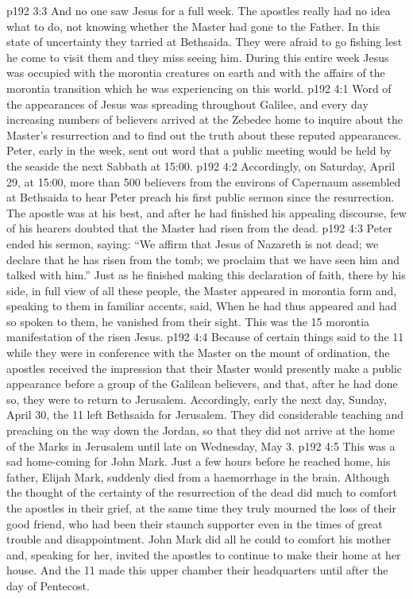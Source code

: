 \vs p192 3:3 \pc And no one saw Jesus for a full week. The apostles really had no idea what to do, not knowing whether the Master had gone to the Father. In this state of uncertainty they tarried at Bethsaida. They were afraid to go fishing lest he come to visit them and they miss seeing him. During this entire week Jesus was occupied with the morontia creatures on earth and with the affairs of the morontia transition which he was experiencing on this world.
\vs p192 4:1 Word of the appearances of Jesus was spreading throughout Galilee, and every day increasing numbers of believers arrived at the Zebedee home to inquire about the Master’s resurrection and to find out the truth about these reputed appearances. Peter, early in the week, sent out word that a public meeting would be held by the seaside the next Sabbath at 15:00.
\vs p192 4:2 Accordingly, on Saturday, April 29, at 15:00, more than 500 believers from the environs of Capernaum assembled at Bethsaida to hear Peter preach his first public sermon since the resurrection. The apostle was at his best, and after he had finished his appealing discourse, few of his hearers doubted that the Master had risen from the dead.
\vs p192 4:3 Peter ended his sermon, saying: “We affirm that Jesus of Nazareth is not dead; we declare that he has risen from the tomb; we proclaim that we have seen him and talked with him.” Just as he finished making this declaration of faith, there by his side, in full view of all these people, the Master appeared in morontia form and, speaking to them in familiar accents, said,  When he had thus appeared and had so spoken to them, he vanished from their sight. This was the 15 morontia manifestation of the risen Jesus.
\vs p192 4:4 \pc Because of certain things said to the 11 while they were in conference with the Master on the mount of ordination, the apostles received the impression that their Master would presently make a public appearance before a group of the Galilean believers, and that, after he had done so, they were to return to Jerusalem. Accordingly, early the next day, Sunday, April 30, the 11 left Bethsaida for Jerusalem. They did considerable teaching and preaching on the way down the Jordan, so that they did not arrive at the home of the Marks in Jerusalem until late on Wednesday, May 3.
\vs p192 4:5 \pc This was a sad home\hyp{}coming for John Mark. Just a few hours before he reached home, his father, Elijah Mark, suddenly died from a haemorrhage in the brain. Although the thought of the certainty of the resurrection of the dead did much to comfort the apostles in their grief, at the same time they truly mourned the loss of their good friend, who had been their staunch supporter even in the times of great trouble and disappointment. John Mark did all he could to comfort his mother and, speaking for her, invited the apostles to continue to make their home at her house. And the 11 made this upper chamber their headquarters until after the day of Pentecost.
